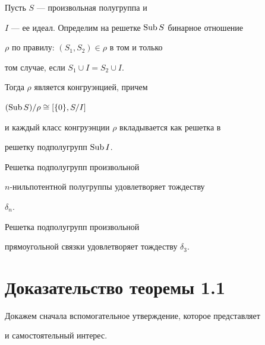 \begin{lemm} Пусть $S$ --- произвольная полугруппа и


$I$ --- ее идеал. Определим на решетке $\operatorname{Sub} S$ бинарное отношение


$\rho$ по правилу: $(S_1,S_2) \in \rho$ в том и только


том случае, если $S_1 \cup I = S_2 \cup I$.


Тогда $\rho$ является конгруэнцией, причем


$(\operatorname{Sub} S)/\rho \cong [\{0\}, S/I]$


и каждый класс конгруэнции $\rho$ вкладывается как решетка в


решетку подполугрупп $\operatorname{Sub} I$.


\end{lemm}





\begin{lemm} Решетка подполугрупп произвольной


$n$-нильпотентной полугруппы удовлетворяет тождеству


$\delta_n$.


\end{lemm}





\begin{lemm} Решетка подполугрупп произвольной


прямоугольной связки удовлетворяет тождеству $\delta_3$.


\end{lemm}





\section{Доказательство теоремы 1.1}





Докажем сначала вспомогательное утверждение, которое представляет


и самостоятельный интерес.







